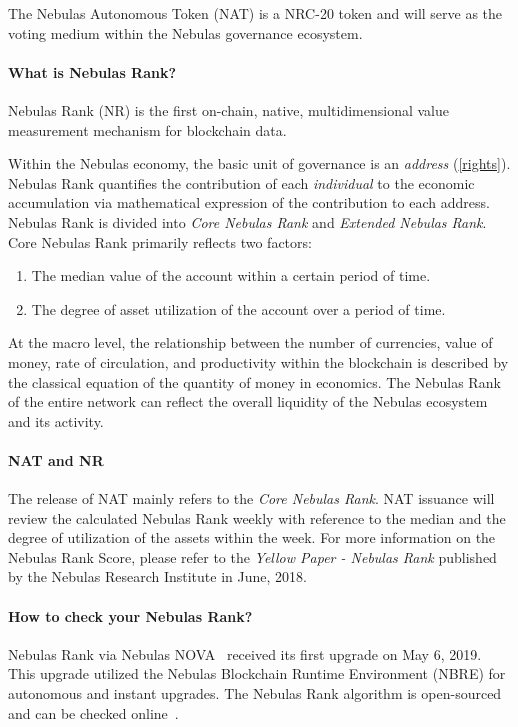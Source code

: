 The Nebulas Autonomous Token (NAT) is a NRC-20 token and will serve as the voting medium within the Nebulas governance ecosystem.

\begin{center}
\colorbox{yellow!30}{
\begin{minipage}[c]{.8\textwidth}
	\paragraph{What is Nebulas Rank?}
	Nebulas Rank (NR) is the first on-chain, native, multidimensional value measurement mechanism for blockchain data.

  Within the Nebulas economy, the basic unit of governance is an \emph{address}
  (\ref{rights}). Nebulas Rank quantifies the contribution of each
  \emph{individual} to the economic accumulation via mathematical expression of
  the contribution to each address. Nebulas Rank is divided into \emph{Core
  Nebulas Rank} and \emph{Extended Nebulas Rank}. Core Nebulas Rank primarily reflects two factors:

	\begin{enumerate}
		\item The median value of the account within a certain period of time.
		\item The degree of asset utilization of the account over a period of time.
	\end{enumerate}

	At the macro level, the relationship between the number of currencies, value of money, rate of circulation, and productivity within the blockchain is described by the classical equation of the quantity of money in economics. The Nebulas Rank of the entire network can reflect the overall liquidity of the Nebulas ecosystem and its activity.


	\paragraph{NAT and NR}

  The release of NAT mainly refers to the \emph{Core Nebulas Rank}. NAT issuance will review the calculated Nebulas Rank weekly with reference to the median and the degree of utilization of the assets within the week. For more information on the Nebulas Rank Score, please refer to the \textit{Yellow Paper - Nebulas Rank} published by the Nebulas Research Institute in June, 2018.


	\paragraph{How to check your Nebulas Rank?}

Nebulas Rank via Nebulas NOVA~\cite{nova} received its first upgrade on May 6, 2019. This upgrade utilized the Nebulas Blockchain Runtime Environment (NBRE) for autonomous and instant upgrades. The Nebulas Rank algorithm is open-sourced and can be checked online~\cite{CheckNR}.


\end{minipage}}
\end{center}

